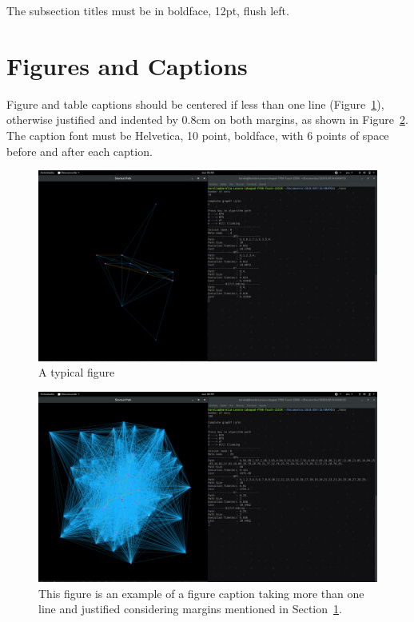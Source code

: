 \documentclass[12pt]{article}
\begin{document}
The subsection titles must be in boldface, 12pt, flush left.

\section{Figures and Captions}\label{sec:figs}


Figure and table captions should be centered if less than one line
(Figure~\ref{fig:exampleFig1}), otherwise justified and indented by 0.8cm on
both margins, as shown in Figure~\ref{fig:exampleFig2}. The caption font must
be Helvetica, 10 point, boldface, with 6 points of space before and after each
caption.

\begin{figure}[ht]
\centering
\includegraphics[width=1.0\textwidth]{Template_SBC/template-latex/screen1.png}
\caption{A typical figure}
\label{fig:exampleFig1}
\end{figure}

\begin{figure}[ht]
\centering
\includegraphics[width=1.0\textwidth]{Template_SBC/template-latex/screen2.png}
\caption{This figure is an example of a figure caption taking more than one
  line and justified considering margins mentioned in Section~\ref{sec:figs}.}
\label{fig:exampleFig2}
\end{figure}
\end{document}
